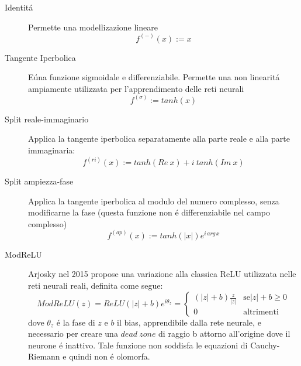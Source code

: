 \documentclass[a4paper,10pt]{article}
\begin{document}
 \begin{description}
 \item[Identit\'a]
 Permette una modellizazione lineare
 \begin{equation}
  f^{\left(-\right) }\left(x\right) := x
 \end{equation}

 \item[Tangente Iperbolica]
 E\' una funzione sigmoidale e differenziabile. Permette una non linearit\'a ampiamente utilizzata per l'apprendimento delle reti neurali
 \begin{equation}
  f^{\left(\sigma\right) } := tanh\left( x\right)
 \end{equation}

 \item[Split reale-immaginario]
 Applica la tangente iperbolica separatamente alla parte reale e alla parte immaginaria:
 \begin{equation}
  f^{\left( ri\right)} \left( x\right) := tanh\left( Re \ x\right) +i \ tanh\left( Im \ x\right)
 \end{equation}

 \item[Split ampiezza-fase]
 Applica la tangente iperbolica al modulo del numero complesso, senza modificarne la fase (questa funzione non \'e differenziabile nel campo complesso)
 \begin{equation}
  f^{\left( ap\right) } \left( x\right) := tanh\left( \left| x\right|\right) e^{i \, arg \, x}
 \end{equation}
 
 \item[ModReLU]
 Arjosky nel 2015 propose una variazione alla classica ReLU utilizzata nelle reti neurali reali, definita come segue:
 \begin{equation}
  ModReLU\left( z\right) = ReLU\left( \left| z\right|+b\right) e^{i\theta_z} = \begin{cases}
                                                                                               \left(\left| z\right| +b\right) \frac{z}{\left| z\right|} & \mbox{se} \left| z\right| +b \ge 0 \\
                                                                                0 & \mbox{altrimenti}
                                                                
                                                                \end{cases}
 \end{equation}
 dove $\theta_z$ \'e la fase di $z$ e $b$ il bias, apprendibile dalla rete neurale, e necessario per creare una $dead \ zone$ di raggio b attorno all'origine dove il neurone \'e inattivo. Tale funzione non soddisfa le equazioni di Cauchy-Riemann e quindi non \'e olomorfa.
 

\end{description}
\end{document}
